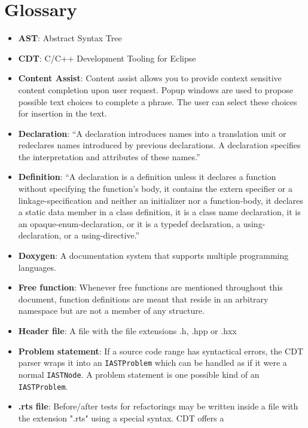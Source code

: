 \chapter{Glossary}
\thispagestyle{fancy}

\begin{itemize}
\item \textbf{AST}: Abstract Syntax Tree
\item \textbf{CDT}: C/C++ Development Tooling for Eclipse
\item \textbf{Content Assist}: Content assist allows you to provide context 
sensitive content completion upon user request. Popup windows are used to 
propose possible text choices to complete a phrase. The user can select these 
choices for insertion in the text. \cite{assist}
\item \textbf{Declaration}: ``A declaration introduces names into a translation 
unit or redeclares names introduced by previous declarations. A declaration 
specifies the interpretation and attributes of these names.''\cite{IsoCpp}
\item \textbf{Definition}: ``A declaration is a definition unless it declares a 
function without specifying the function’s body, it contains the extern 
specifier or a linkage-specification and neither an initializer nor a 
function-body, it declares a static data member in a class definition, it is a 
class name declaration, it is an opaque-enum-declaration, or it is a typedef 
declaration, a using-declaration, or a using-directive.''\cite{IsoCpp}
\item \textbf{Doxygen}: A documentation system that supports multiple 
programming languages.
\item \textbf{Free function}: Whenever free functions are mentioned throughout this document, function definitions are meant that reside in an arbitrary namespace but are not a member of any structure.
\item \textbf{Header file}: A file with the file extensions .h, .hpp or .hxx
\item \textbf{Problem statement}: If a source code range has syntactical errors, 
the CDT parser wraps it into an \texttt{IASTProblem} which can be handled as if 
it were a normal \texttt{IASTNode}. A problem statement is one possible kind of 
an \texttt{IASTProblem}.
\item \textbf{.rts file}: Before/after tests for refactorings may be written 
inside a file with the extension ".rts" using a special syntax. CDT offers a 

\end{itemize}
